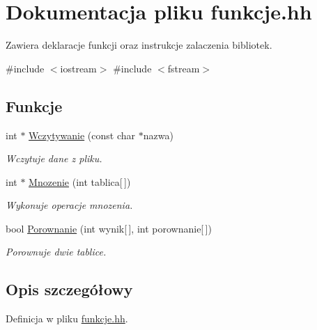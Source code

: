 \hypertarget{funkcje_8hh}{\section{\-Dokumentacja pliku funkcje.\-hh}
\label{funkcje_8hh}
}


\-Zawiera deklaracje funkcji oraz instrukcje zalaczenia bibliotek.  


{\ttfamily \#include $<$iostream$>$}\*
{\ttfamily \#include $<$fstream$>$}\*
\subsection*{\-Funkcje}
\begin{DoxyCompactItemize}
\item 
int $\ast$ \hyperlink{funkcje_8hh_a8bbf700936be11136643474b49fa1764}{\-Wczytywanie} (const char $\ast$nazwa)
\begin{DoxyCompactList}\small\item\em \-Wczytuje dane z pliku. \end{DoxyCompactList}\item 
int $\ast$ \hyperlink{funkcje_8hh_ae11a32cee0192a595fcb71a98c32ee71}{\-Mnozenie} (int tablica\mbox{[}$\,$\mbox{]})
\begin{DoxyCompactList}\small\item\em \-Wykonuje operacje mnozenia. \end{DoxyCompactList}\item 
bool \hyperlink{funkcje_8hh_a721a30457d3f93333a2389712ab9153d}{\-Porownanie} (int wynik\mbox{[}$\,$\mbox{]}, int porownanie\mbox{[}$\,$\mbox{]})
\begin{DoxyCompactList}\small\item\em \-Porownuje dwie tablice. \end{DoxyCompactList}\end{DoxyCompactItemize}


\subsection{\-Opis szczegółowy}


\-Definicja w pliku \hyperlink{funkcje_8hh_source}{funkcje.\-hh}.



